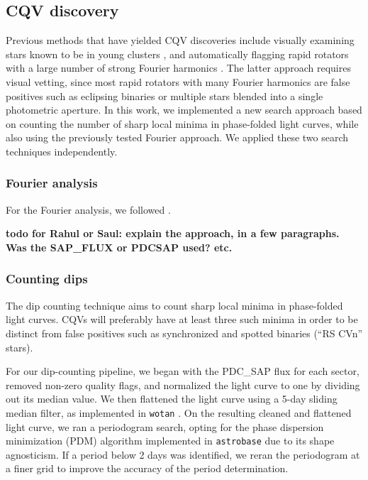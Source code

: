\documentclass[11pt,twocolumn,tighten]{aastex63}
\begin{document}
\subsection{CQV discovery}
\label{subsec:discoverymethods}

Previous methods that have yielded CQV discoveries include visually
examining stars known to be in young clusters
\citep{2016AJ....152..114R,2017AJ....153..152S}, and automatically
flagging rapid rotators with a large number of strong Fourier
harmonics \citep{2019ApJ...876..127Z}.  The latter approach requires
visual vetting, since most rapid rotators with many Fourier harmonics
are false positives such as eclipsing binaries or multiple stars
blended into a single photometric aperture.  In this work, we
implemented a new search approach based on counting the number of
sharp local minima in phase-folded light curves, while also using the
previously tested Fourier approach.  We applied these two search
techniques independently.   


\subsubsection{Fourier analysis}
\label{subsec:fourier}
For the Fourier analysis, we followed \citet{2019ApJ...876..127Z}.

{\bf todo for Rahul or Saul: explain the approach, in a few
paragraphs.  Was the SAP\_FLUX or PDCSAP used? etc. }


\subsubsection{Counting dips}
\label{subsec:counting}

The dip counting technique aims to count sharp local minima in
phase-folded light curves.  CQVs will preferably have at least three
such minima in order to be distinct from false positives such as
synchronized and spotted binaries (``RS CVn'' stars). 

For our dip-counting pipeline, we began with the PDC\_SAP flux for
each sector, removed non-zero quality flags, and normalized the light
curve to one by dividing out its median value.  We then flattened the
light curve using a 5-day sliding median filter, as implemented in
\texttt{wotan} \citep{2019AJ....158..143H}.  On the resulting cleaned
and flattened light curve, we ran a periodogram search, opting for the
\citet{1978ApJ...224..953S} phase dispersion minimization (PDM)
algorithm implemented in \texttt{astrobase}
\citep{2021zndo...1011188B} due to its shape agnosticism.  If a period
below 2 days was identified, we reran the periodogram at a finer grid
to improve the accuracy of the period determination.
\end{document}
